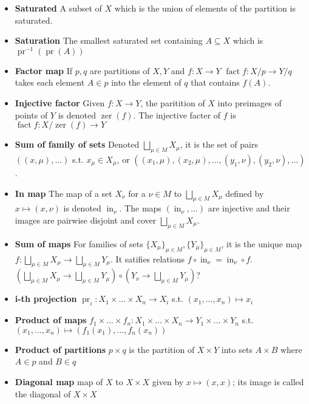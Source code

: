 \documentclass{article}
\DeclareMathOperator{\pr}{pr}
\DeclareMathOperator{\fact}{fact}
\DeclareMathOperator{\zer}{zer}
\DeclareMathOperator{\inn}{in}
\begin{document}
\begin{itemize}
\item \textbf{Saturated} A subset of \(X\) which is the union of elements of the partition is saturated.
\item \textbf{Saturation} The smallest saturated set containing \(A\subseteq X\) which is \(\pr^{-1}(\pr(A))\)
\item \textbf{Factor map} If \(p,q\) are partitions of \(X,Y\) and \(f:X\to Y\) \(\fact f:X/p\to Y/q\) takes each element \(A\in p\) into the element of \(q\) that contains \(f(A)\).
\item \textbf{Injective factor} Given \(f:X\to Y\), the paritition of \(X\) into preimages of points of \(Y\) is denoted \(\zer(f)\). The injective facter of \(f\) is \(\fact f:X/\zer(f)\to Y\)
\item \textbf{Sum of family of sets} Denoted \(\bigsqcup_{\mu\in M}X_{\mu}\), it is the set of pairs \(((x,\mu),...)\) s.t. \(x_{\mu}\in X_{\mu}\), or \(((x_{1},\mu),(x_{2},\mu),...,(y_{1},\nu),(y_{2},\nu),...)\).
\item \textbf{In map} The map of a set \(X_{\nu}\) for a \(\nu\in M\) to \(\bigsqcup_{\mu\in M}X_{\mu}\) defined by \(x\mapsto (x,\nu)\) is denoted \(\inn_{\nu}\). 
    The maps \((\inn_{\nu},...)\) are injective and their images are pairwise disjoint and cover \(\bigsqcup_{\mu\in M}X_{\mu}\).
\item \textbf{Sum of maps} For families of sets \(\{X_{\mu}\}_{\mu\in M}, \{Y_{\mu}\}_{\mu\in M}\), it is the unique map \(f:\bigsqcup_{\mu\in M}X_{\mu}\to\bigsqcup_{\mu\in M}Y_{\mu}\).
    It satifies relations \(f\circ \inn_{\nu}=\inn_{\nu}\circ f\). \color{red}\((\bigsqcup_{\mu\in M}X_{\mu}\to\bigsqcup_{\mu\in M}Y_{\mu})\circ (Y_{\nu}\to\bigsqcup_{\mu\in M}Y_{\mu})\)?\color{black}
\item \textbf{i-th projection} \(\pr_{i}:X_{1}\times...\times X_{n}\to X_{i}\) s.t. \((x_{1},...,x_{n})\mapsto x_{i}\)
\item \textbf{Product of maps} \(f_{1}\times ...\times f_{n}:X_{1}\times ...\times X_{n}\to Y_{1}\times ...\times Y_{n}\) s.t. \((x_{1},...,x_{n})\mapsto(f_{1}(x_{1}),...,f_{n}(x_{n}))\)
\item \textbf{Product of partitions} \(p\times q\) is the partition of \(X\times Y\) into sets \(A\times B\) where \(A\in p\) and \(B\in q\)
\item \textbf{Diagonal map} map of \(X\) to \(X\times X\) given by \(x\mapsto (x,x)\); its image is called the diagonal of \(X\times X\)
\end{itemize}
\end{document}
